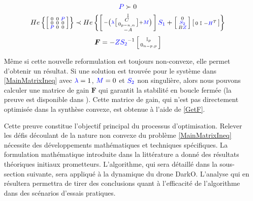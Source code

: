 \begin{equation}
\centering
  \begin{gathered}
        \textcolor{blue}{P} \succ 0 \\
        He\left\{ \smallmat{
            0 & 0 & \textcolor{blue}{P}\\
            0 & 0 & 0\\
            \textcolor{blue}{P} & 0 & 0
        }\right\}
    \prec
    He\left\{\smallmat{
        \mathbb{I}\\
            -\left( \textcolor{blue}{\lambda} \smallmat{
                C\\
                0_{p-n,n}                
            } + \textcolor{blue}{M} \right)\\
            -A
    }
    \textcolor{blue}{S_1} +
    \smallmat{
        0\\
        \textcolor{blue}{S_2}\\
        B\textcolor{blue}{Z}
    }
    \smallmat{
        0 & \mathbb{I} & -\textcolor{blue}{H}^T
    }\right\}
    \end{gathered}
    \label{MainMatrixIneq}
\end{equation}
\begin{equation}
    \boldsymbol{F} = -\textcolor{blue}{Z} \textcolor{blue}{S_2}^{-1} \left[ \begin{smallmatrix} \mathbb{I}_p \\ 0_{n-p,p}  \end{smallmatrix} \right]
    \label{GetF}
\end{equation}

Même si cette nouvelle reformulation est toujours non-convexe, elle permet d'obtenir un résultat. Si une solution est trouvée pour le système dans \eqref{MainMatrixIneq} avec $\textcolor{blue}{\lambda} = 1$, $\textcolor{blue}{M} = 0$ et $\textcolor{blue}{S_2}$ non singulière, alors nous pouvons calculer une matrice de gain $\boldsymbol{F}$ qui garantit la stabilité en boucle fermée (la preuve est disponible dans \cite{Arzelier2018}). Cette matrice de gain, qui n'est pas directement optimisée dans la synthèse convexe, est obtenue à l'aide de \eqref{GetF}. 

Cette preuve constitue l'objectif principal du processus d'optimisation. Relever les défis découlant de la nature non convexe du problème \ref{MainMatrixIneq} nécessite des développements mathématiques et techniques spécifiques. La formulation mathématique introduite dans la littérature a donné des résultats théoriques initiaux prometteurs. L'algorithme, qui sera détaillé dans la sous-section suivante, sera appliqué à la dynamique du drone DarkO. L'analyse qui en résultera permettra de tirer des conclusions quant à l'efficacité de l'algorithme dans des scénarios d'essais pratiques.


